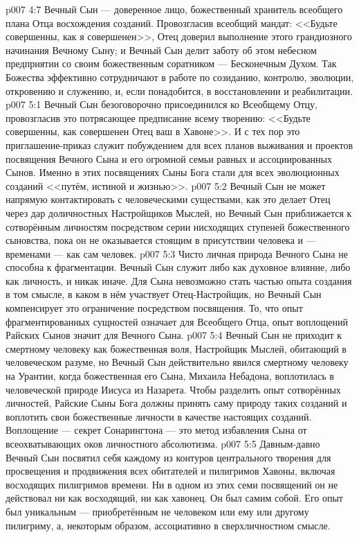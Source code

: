 \vs p007 4:7 \pc Вечный Сын --- доверенное лицо, божественный хранитель всеобщего плана Отца восхождения созданий. Провозгласив всеобщий мандат: <<Будьте совершенны, как я совершенен>>, Отец доверил выполнение этого грандиозного начинания Вечному Сыну; и Вечный Сын делит заботу об этом небесном предприятии со своим божественным соратником --- Бесконечным Духом. Так Божества эффективно сотрудничают в работе по созиданию, контролю, эволюции, откровению и служению, и, если понадобится, в восстановлении и реабилитации.
\vs p007 5:1 Вечный Сын безоговорочно присоединился ко Всеобщему Отцу, провозгласив это потрясающее предписание всему творению: <<Будьте совершенны, как совершенен Отец ваш в Хавоне>>. И с тех пор это приглашение\hyp{}приказ служит побуждением для всех планов выживания и проектов посвящения Вечного Сына и его огромной семьи равных и ассоциированных Сынов. Именно в этих посвящениях Сыны Бога стали для всех эволюционных созданий <<путём, истиной и жизнью>>.
\vs p007 5:2 Вечный Сын не может напрямую контактировать с человеческими существами, как это делает Отец через дар доличностных Настройщиков Мыслей, но Вечный Сын приближается к сотворённым личностям посредством серии нисходящих ступеней божественного сыновства, пока он не оказывается стоящим в присутствии человека и --- временами --- как сам человек.
\vs p007 5:3 Чисто личная природа Вечного Сына не способна к фрагментации. Вечный Сын служит либо как духовное влияние, либо как личность, и никак иначе. Для Сына невозможно стать частью опыта создания в том смысле, в каком в нём участвует Отец\hyp{}Настройщик, но Вечный Сын компенсирует это ограничение посредством посвящения. То, что опыт фрагментированных сущностей означает для Всеобщего Отца, опыт воплощений Райских Сынов значит для Вечного Сына.
\vs p007 5:4 Вечный Сын не приходит к смертному человеку как божественная воля, Настройщик Мыслей, обитающий в человеческом разуме, но Вечный Сын действительно явился смертному человеку на Урантии, когда божественная  его Сына, Михаила Небадона, воплотилась в человеческой природе Иисуса из Назарета. Чтобы разделить опыт сотворённых личностей, Райские Сыны Бога должны принять саму природу таких созданий и воплотить свои божественные личности в качестве настоящих созданий. Воплощение --- секрет Сонарингтона --- это метод избавления Сына от всеохватывающих оков личностного абсолютизма.
\vs p007 5:5 \pc Давным\hyp{}давно Вечный Сын посвятил себя каждому из контуров центрального творения для просвещения и продвижения всех обитателей и пилигримов Хавоны, включая восходящих пилигримов времени. Ни в одном из этих семи посвящений он не действовал ни как восходящий, ни как хавонец. Он был самим собой. Его опыт был уникальным --- приобретённым не  человеком или  ему или другому пилигриму, а, некоторым образом, ассоциативно в сверхличностном смысле.
